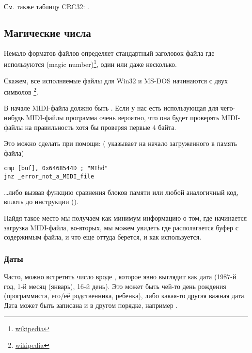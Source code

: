 См. также таблицу CRC32: .

\subsection{Магические числа}

\newcommand{\FNURLMAGIC}{\footnote{\href{http://go.yurichev.com/17112}{wikipedia}}}

Немало форматов файлов определяет стандартный заголовок файла где используются  (magic number)\FNURLMAGIC{}, один или даже несколько.

Скажем, все исполняемые файлы для Win32 и MS-DOS начинаются с двух символов \footnote{\href{http://go.yurichev.com/17113}{wikipedia}}.

В начале MIDI-файла должно быть . Если у нас есть использующая для чего-нибудь MIDI-файлы программа
очень вероятно, что она будет проверять MIDI-файлы на правильность хотя бы проверяя первые 4 байта.

Это можно сделать при помощи:
( указывает на начало загруженного в память файла)

\begin{lstlisting}
cmp [buf], 0x6468544D ; "MThd"
jnz _error_not_a_MIDI_file
\end{lstlisting}

\dots либо вызвав функцию сравнения блоков памяти  или любой аналогичный код, 
вплоть до инструкции  ().

Найдя такое место мы получаем как минимум информацию о том, где начинается загрузка MIDI-файла, во-вторых, 
мы можем увидеть где располагается буфер с содержимым файла, и что еще оттуда берется, и как используется.

\subsubsection{Даты}


Часто, можно встретить число вроде , которое явно выглядит как дата (1987-й год, 1-й месяц (январь), 16-й день).
Это может быть чей-то день рождения (программиста, его/её родственника, ребенка), либо какая-то другая важная дата.
Дата может быть записана и в другом порядке, например .

